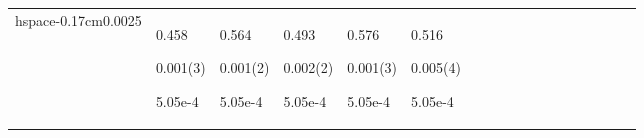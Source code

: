 \begin{longtable}{|p{0.01cm}|p{0.25cm}p{0.25cm}p{0.25cm}p{0.25cm}p{0.25cm}p{0.25cm}p{0.25cm}p{0.25cm}p{0.25cm}p{0.25cm}p{0.25cm}p{0.25cm}p{0.25cm}p{0.25cm}p{0.25cm}p{0.25cm}p{0.25cm}|}
hspace{-0.17cm}0.0025}} & \par{\tiny \parbox{1cm}{\hspace{-0.17cm}0.458}}\par{\tiny \parbox{1cm}{\hspace{-0.17cm}0.001(3)}}\par{\tiny \parbox{1cm}{\hspace{-0.17cm}5.05e-4}} & \par{\tiny \parbox{1cm}{\hspace{-0.17cm}0.564}}\par{\tiny \parbox{1cm}{\hspace{-0.17cm}0.001(2)}}\par{\tiny \parbox{1cm}{\hspace{-0.17cm}5.05e-4}} & \par{\tiny \parbox{1cm}{\hspace{-0.17cm}0.493}}\par{\tiny \parbox{1cm}{\hspace{-0.17cm}0.002(2)}}\par{\tiny \parbox{1cm}{\hspace{-0.17cm}5.05e-4}} & \par{\tiny \parbox{1cm}{\hspace{-0.17cm}0.576}}\par{\tiny \parbox{1cm}{\hspace{-0.17cm}0.001(3)}}\par{\tiny \parbox{1cm}{\hspace{-0.17cm}5.05e-4}} & \par{\tiny \parbox{1cm}{\hspace{-0.17cm}0.516}}\par{\tiny \parbox{1cm}{\hspace{-0.17cm}0.005(4)}}\par{\tiny \parbox{1cm}{\hspace{-0.17cm}5.05e-4}}\\

\end{longtable}
